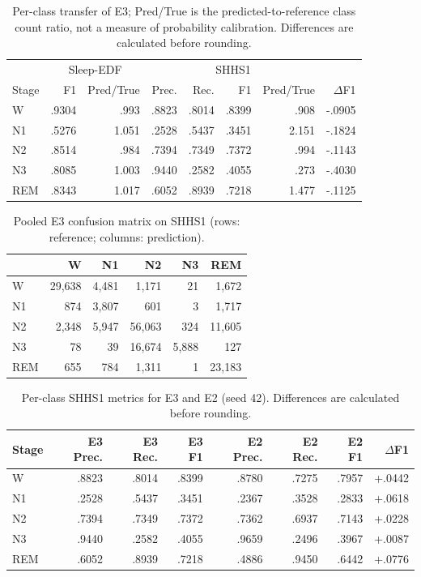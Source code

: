 \documentclass[10pt,a4paper]{article}
\begin{document}
\begin{table}[H]
\centering\small
\caption{Per-class transfer of E3; Pred/True is the predicted-to-reference class count ratio,
not a measure of probability calibration. Differences are calculated before rounding.}
\label{tab:sup_perclass_transfer}
\begin{tabular}{lrrrrrrr}
\toprule
& \multicolumn{2}{c}{Sleep-EDF} & \multicolumn{4}{c}{SHHS1} & \\
Stage & F1 & Pred/True & Prec. & Rec. & F1 & Pred/True & $\Delta$F1 \\
\midrule
W & .9304 & .993 & .8823 & .8014 & .8399 & .908 & -.0905 \\
N1 & .5276 & 1.051 & .2528 & .5437 & .3451 & 2.151 & -.1824 \\
N2 & .8514 & .984 & .7394 & .7349 & .7372 & .994 & -.1143 \\
N3 & .8085 & 1.003 & .9440 & .2582 & .4055 & .273 & -.4030 \\
REM & .8343 & 1.017 & .6052 & .8939 & .7218 & 1.477 & -.1125 \\
\bottomrule
\end{tabular}
\end{table}

\begin{table}[H]
\centering\small
\caption{Pooled E3 confusion matrix on SHHS1 (rows: reference; columns: prediction).}
\label{tab:sup_shhs_confusion}
\begin{tabular}{lrrrrr}
\toprule
 & W & N1 & N2 & N3 & REM \\
\midrule
W & 29{,}638 & 4{,}481 & 1{,}171 & 21 & 1{,}672 \\
N1 & 874 & 3{,}807 & 601 & 3 & 1{,}717 \\
N2 & 2{,}348 & 5{,}947 & 56{,}063 & 324 & 11{,}605 \\
N3 & 78 & 39 & 16{,}674 & 5{,}888 & 127 \\
REM & 655 & 784 & 1{,}311 & 1 & 23{,}183 \\
\bottomrule
\end{tabular}
\end{table}

\begin{table}[H]
\centering\small
\caption{Per-class SHHS1 metrics for E3 and E2 (seed 42).
Differences are calculated before rounding.}
\label{tab:sup_shhs_e3_e2_perclass}
\begin{tabular}{lrrrrrrr}
\toprule
Stage & E3 Prec. & E3 Rec. & E3 F1 & E2 Prec. & E2 Rec. & E2 F1 & $\Delta$F1 \\
\midrule
W & .8823 & .8014 & .8399 & .8780 & .7275 & .7957 & +.0442 \\
N1 & .2528 & .5437 & .3451 & .2367 & .3528 & .2833 & +.0618 \\
N2 & .7394 & .7349 & .7372 & .7362 & .6937 & .7143 & +.0228 \\
N3 & .9440 & .2582 & .4055 & .9659 & .2496 & .3967 & +.0087 \\
REM & .6052 & .8939 & .7218 & .4886 & .9450 & .6442 & +.0776 \\
\bottomrule
\end{tabular}
\end{table}
\end{document}
